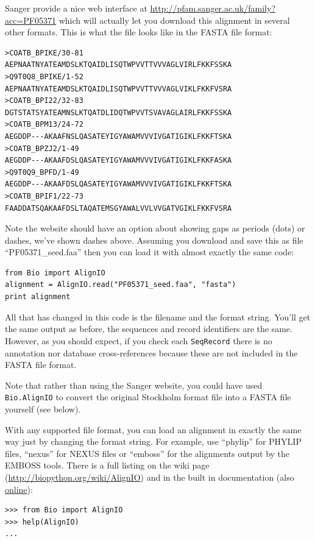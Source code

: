 \documentclass{report}
\begin{document}
Sanger provide a nice web interface at \url{http://pfam.sanger.ac.uk/family?acc=PF05371} which will actually let you download this alignment in several other formats.  This is what the file looks like in the FASTA file format:

\begin{verbatim}
>COATB_BPIKE/30-81
AEPNAATNYATEAMDSLKTQAIDLISQTWPVVTTVVVAGLVIRLFKKFSSKA
>Q9T0Q8_BPIKE/1-52
AEPNAATNYATEAMDSLKTQAIDLISQTWPVVTTVVVAGLVIKLFKKFVSRA
>COATB_BPI22/32-83
DGTSTATSYATEAMNSLKTQATDLIDQTWPVVTSVAVAGLAIRLFKKFSSKA
>COATB_BPM13/24-72
AEGDDP---AKAAFNSLQASATEYIGYAWAMVVVIVGATIGIKLFKKFTSKA
>COATB_BPZJ2/1-49
AEGDDP---AKAAFDSLQASATEYIGYAWAMVVVIVGATIGIKLFKKFASKA
>Q9T0Q9_BPFD/1-49
AEGDDP---AKAAFDSLQASATEYIGYAWAMVVVIVGATIGIKLFKKFTSKA
>COATB_BPIF1/22-73
FAADDATSQAKAAFDSLTAQATEMSGYAWALVVLVVGATVGIKLFKKFVSRA
\end{verbatim}

\noindent Note the website should have an option about showing gaps as periods (dots) or dashes, we've shown dashes above.  Assuming you download and save this as file ``PF05371\_seed.faa'' then you can load it with almost exactly the same code:

\begin{verbatim}
from Bio import AlignIO
alignment = AlignIO.read("PF05371_seed.faa", "fasta")
print alignment
\end{verbatim}

All that has changed in this code is the filename and the format string.  You'll get the same output as before, the sequences and record identifiers are the same.
However, as you should expect, if you check each \verb|SeqRecord| there is no annotation nor database cross-references because these are not included in the FASTA file format.

Note that rather than using the Sanger website, you could have used \verb|Bio.AlignIO| to convert the original Stockholm format file into a FASTA file yourself (see below).

With any supported file format, you can load an alignment in exactly the same way just by changing the format string.  For example, use ``phylip'' for PHYLIP files, ``nexus'' for NEXUS files or ``emboss'' for the alignments output by the EMBOSS tools.  There is a full listing on the wiki page (\url{http://biopython.org/wiki/AlignIO}) and in the built in documentation (also \href{http://biopython.org/DIST/docs/api/Bio.AlignIO-module.html}{online}):

\begin{verbatim}
>>> from Bio import AlignIO
>>> help(AlignIO)
...
\end{verbatim}
\end{document}
